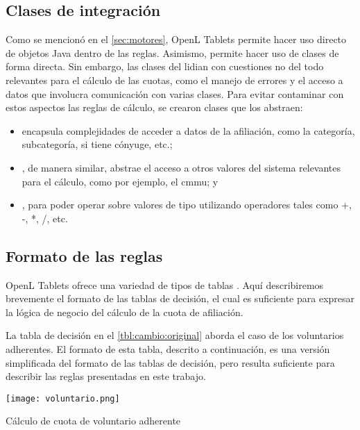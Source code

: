 \subsection{Clases de integración}\label{ssec:integracion:clases}

Como se mencionó en el \cref{sec:motores}, OpenL Tablets permite hacer uso directo de objetos Java dentro de las reglas.
Asimismo, permite hacer uso de clases de forma directa.
Sin embargo, las clases del {\SIDOSPU} lidian con cuestiones no del todo relevantes para el cálculo de las cuotas, como el manejo de errores y el acceso a datos que involucra comunicación con varias clases.
Para evitar contaminar con estos aspectos las reglas de cálculo, se crearon clases que los abstraen:
\begin{itemize}
    \item {} encapsula complejidades de acceder a datos de la afiliación, como la categoría, subcategoría, si tiene cónyuge, etc.;
    \item {}, de manera similar, abstrae el acceso a otros valores del sistema relevantes para el cálculo, como por ejemplo, el \acrshort{cmmu}; y
    \item {}, para poder operar sobre valores de tipo  utilizando operadores tales como +, -, *, /, etc.
\end{itemize}

\subsection{Formato de las reglas}

OpenL Tablets ofrece una variedad de tipos de tablas \cite{openl}.
Aquí describiremos brevemente el formato de las tablas de decisión, el cual es suficiente para expresar la lógica de negocio del cálculo de la cuota de afiliación.

La tabla de decisión en el \cref{tbl:cambio:original} aborda el caso de los voluntarios adherentes.
El formato de esta tabla, descrito a continuación, es una versión simplificada del formato de las tablas de decisión, pero resulta suficiente para describir las reglas presentadas en este trabajo.

\begin{table*}[h]
    \centering
    \texttt{[image: voluntario.png]}
    \caption{Cálculo de cuota de voluntario adherente}
    \label{tbl:cambio:original}
\end{table*}

